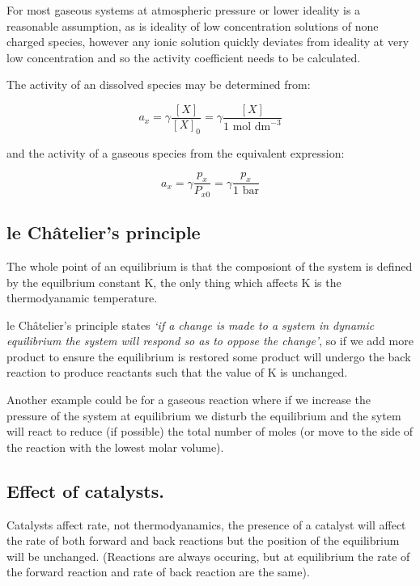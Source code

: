 \documentclass[
]{book}
\begin{document}
For most gaseous systems at atmospheric pressure or lower ideality is a reasonable assumption, as is ideality of low concentration solutions of none charged species, however any ionic solution quickly deviates from ideality at very low concentration and so the activity coefficient needs to be calculated.

The activity of an dissolved species may be determined from:

\begin{equation*}
a_x = \gamma \frac{[X]}{[X]_0}= \gamma \frac{[X]}{1 \textrm{ mol dm}^{-3}}
\end{equation*}

and the activity of a gaseous species from the equivalent expression:

\begin{equation*}
a_x =\gamma \frac{p_x}{P_{x0}}= \gamma\frac{p_x}{1 \textrm{ bar}}
\end{equation*}

\hypertarget{le-chuxe2teliers-principle}{%
\subsection{le Châtelier's principle}\label{le-chuxe2teliers-principle}}

The whole point of an equilibrium is that the composiont of the system is defined by the equilbrium constant K, the only thing which affects K is the thermodyanamic temperature.

le Châtelier's principle states \emph{`if a change is made to a system in dynamic equilibrium the system will respond so as to oppose the change'}, so if we add more product to ensure the equilibrium is restored some product will undergo the back reaction to produce reactants such that the value of K is unchanged.

Another example could be for a gaseous reaction where if we increase the pressure of the system at equilibrium we disturb the equilibrium and the sytem will react to reduce (if possible) the total number of moles (or move to the side of the reaction with the lowest molar volume).

\hypertarget{effect-of-catalysts.}{%
\subsection{Effect of catalysts.}\label{effect-of-catalysts.}}

Catalysts affect rate, not thermodyanamics, the presence of a catalyst will affect the rate of both forward and back reactions but the position of the equilibrium will be unchanged. (Reactions are always occuring, but at equilibrium the rate of the forward reaction and rate of back reaction are the same).
\end{document}
